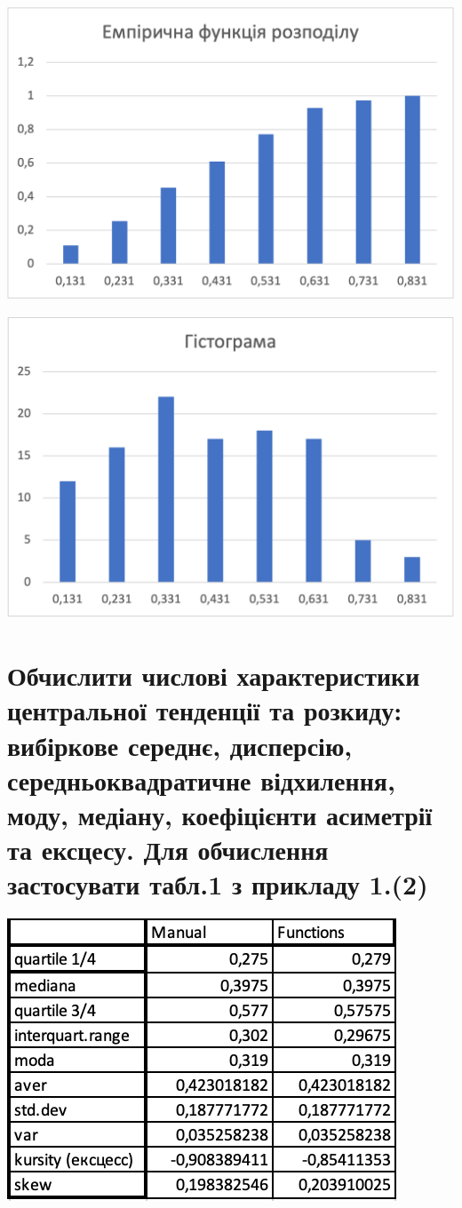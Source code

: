 \documentclass[14pt]{extarticle}
\begin{document}
\includegraphics[width=\textwidth/2]{zvit1-3}

\includegraphics[width=\textwidth/2]{zvit1-4}

\section{Обчислити числові характеристики центральної тенденції та розкиду: вибіркове середнє, дисперсію, середньоквадратичне відхилення, моду, медіану, коефіцієнти асиметрії та ексцесу. Для обчислення застосувати табл.1 з прикладу 1.(2)}

\includegraphics[width=\textwidth*2/3]{zvit1-n3}
\end{document}
